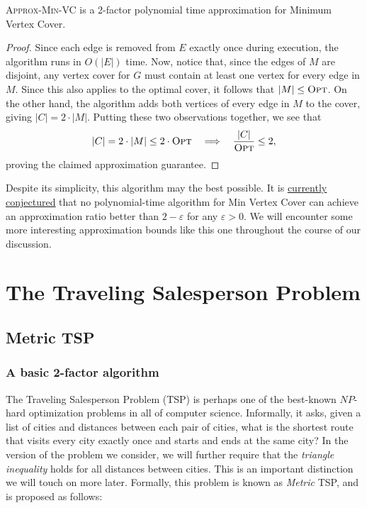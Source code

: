 \documentclass{article}
\newenvironment{theorem}[2][Theorem]{\begin{trivlist}
\item[\hskip \labelsep {\bfseries #1}\hskip \labelsep {\bfseries #2.}]}{\end{trivlist}}
\begin{document}
\begin{theorem}{2.1}{}
    \textsc{Approx-Min-VC} is a 2-factor polynomial time approximation for Minimum Vertex Cover.
    \begin{proof}
        Since each edge is removed from $E$ exactly once during execution, the algorithm runs in $O(|E|)$ time. Now, notice that, since the edges of $M$ are disjoint, any vertex cover for $G$ must contain at least one vertex for every edge in $M$. Since this also applies to the optimal cover, it follows that $|M| \leq \textsc{Opt}$. On the other hand, the algorithm adds both vertices of every edge in $M$ to the cover, giving $|C| = 2 \cdot |M|$. Putting these two observations together, we see that
        \[
        |C| = 2 \cdot |M| \leq 2 \cdot \textsc{Opt} \quad \Longrightarrow \quad \frac{|C|}{\textsc{Opt}} \leq 2,
        \]
        proving the claimed approximation guarantee.
    \end{proof}
\end{theorem}

\noindent Despite its simplicity, this algorithm may the best possible. It is \href{https://www.cs.toronto.edu/~toni/Courses/PCP/handouts/ugc-vc.pdf}{\underline{currently conjectured}} that no polynomial-time algorithm for Min Vertex Cover can achieve an approximation ratio better than $2 - \varepsilon$ for any $\varepsilon > 0$. We will encounter some more interesting approximation bounds like this one throughout the course of our discussion.


\section{The Traveling Salesperson Problem}
 
\subsection{Metric TSP}

\subsubsection{A basic 2-factor algorithm}

The Traveling Salesperson Problem (TSP) is perhaps one of the best-known $NP$-hard optimization problems in all of computer science. Informally, it asks, given a list of cities and distances between each pair of cities, what is the shortest route that visits every city exactly once and starts and ends at the same city? In the version of the problem we consider, we will further require that the \textit{triangle inequality} holds for all distances between cities. This is an important distinction we will touch on more later. Formally, this problem is known as \textit{Metric} TSP, and is proposed as follows:
\end{document}
